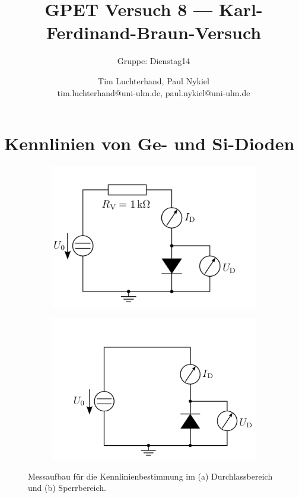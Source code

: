 \documentclass[10pt]{scrreprt}
\author{Tim Luchterhand, Paul Nykiel \protect\\ tim.luchterhand@uni-ulm.de, paul.nykiel@uni-ulm.de}
\title{GPET Versuch 8 --- Karl-Ferdinand-Braun-Versuch}
\subtitle{Gruppe: Dienstag14}
\begin{document}
    \maketitle
    \section{Kennlinien von Ge- und Si-Dioden}
    \begin{figure}[H]
        \begin{subfigure}{.5\textwidth}
            \centering
            \includegraphics[width=\linewidth]{abb13a.png}
            \subcaption{}
            \label{fig:abb13a}
        \end{subfigure}
        \begin{subfigure}{.5\textwidth}
            \centering
            \includegraphics[width=\linewidth]{abb13b.png}
            \subcaption{}
            \label{fig:abb13b}
        \end{subfigure}
        \caption{Messaufbau für die Kennlinienbestimmung im (a) Durchlassbereich und (b) Sperrbereich.}
    \end{figure}
\end{document}
